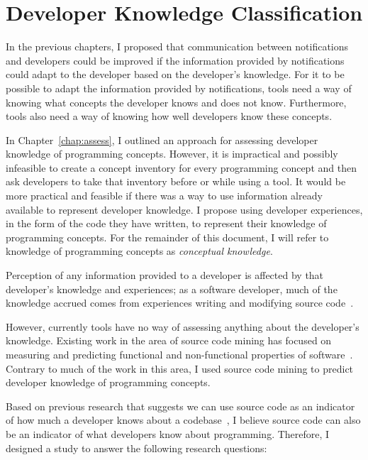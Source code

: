 \chapter{Developer Knowledge Classification}
\label{chap:experience}

In the previous chapters, I proposed that communication between notifications and developers could be improved if the information provided by notifications could adapt to the developer based on the developer's knowledge. 	
For it to be possible to adapt the information provided by notifications, tools need a way of knowing what concepts the developer knows and does not know. Furthermore, tools also need a way of knowing how well developers know these concepts. 	

In Chapter~\ref{chap:assess}, I outlined an approach for assessing developer knowledge of programming concepts. However, it is impractical and possibly infeasible to create a concept inventory for every programming concept and then ask developers to take that inventory before or while using a tool. It would be more practical and feasible if there was a way to use information already available to represent developer knowledge. I propose using developer experiences, in the form of the code they have written, to represent their knowledge of programming concepts. For the remainder of this document, I will refer to knowledge of programming concepts as \textit{conceptual knowledge}.  

Perception of any information provided to a developer is affected by that developer's knowledge and experiences; as a software developer, much of the knowledge accrued comes from experiences writing and modifying source code~\cite{Canas:1994:Mental,raju1995differential,fritz2010degree,argote2011organizational}.

However, currently tools have no way of assessing anything about the developer's knowledge.
Existing work in the area of source code mining has focused on measuring and predicting functional and non-functional properties of software~\cite{heckman2009model,menzies2007data,haapio2011exploring}. 
Contrary to much of the work in this area, I used source code mining to predict developer knowledge of programming concepts.

Based on previous research that suggests we can use source code as an indicator of how much a developer knows about a codebase~\cite{fritz2010degree}, I believe source code can also be an indicator of what developers know about programming.
Therefore, I designed a study to answer the following research questions:

